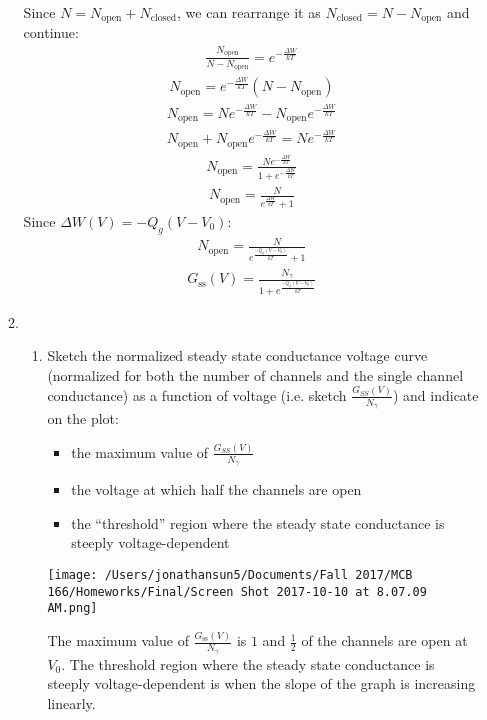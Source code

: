 \documentclass[11pt]{article}
\begin{document}
\begin{enumerate}[label=\arabic*.]
\begin{enumerate}[label=(\alph*)]
Since $N = N_{\text{open}} + N_{\text{closed}}$, we can rearrange it as $N_{\text{closed}} = N - N_{\text{open}}$ and continue:
\begin{align*}
\frac{N_{\text{open}}} {N - N_{\text{open}}} = e ^ {- \frac{\Delta W} {k T}}
\end{align*}
\begin{align*}
N_{\text{open}} = e ^ {- \frac{\Delta W} {k T}} \left(N - N_{\text{open}}\right)
\end{align*}
\begin{align*}
N_{\text{open}} = Ne ^ {- \frac{\Delta W} {k T}} - N_{\text{open}} e ^ {- \frac{\Delta W} {k T}}
\end{align*}
\begin{align*}
N_{\text{open}} + N_{\text{open}} e ^ {- \frac{\Delta W} {k T}} = Ne ^ {- \frac{\Delta W} {k T}}
\end{align*}
\begin{align*}
N_{\text{open}} = \frac{Ne ^ {- \frac{\Delta W} {k T}}} {1 + e ^ {- \frac{\Delta W} {k T}}}
\end{align*}
\begin{align*}
N_{\text{open}} = \frac{N} {e ^ {\frac{\Delta W} {k T}} + 1}
\end{align*}
Since $\Delta W(V) = -Q_g(V - V_0)$:
\begin{align*}
N_{\text{open}} = \frac{N} {e ^ {\frac{-Q_g(V - V_0)} {k T}} + 1}
\end{align*}
\begin{align*}
G_{\text{ss}}(V) = \frac{N_{\gamma}} {1 + e ^ {\frac{-Q_g(V - V_0)} {k T}}}
\end{align*}



\item
\begin{enumerate}[label=(\roman*)]
\item
Sketch the normalized steady state conductance voltage curve (normalized for both the number of channels and the single channel conductance) as a function of voltage (i.e. sketch $\frac{G_{SS}(V)} {N_{\gamma}}$) and indicate on the plot:
\begin{itemize}
\item
the maximum value of $\frac{G_{SS}(V)} {N_{\gamma}}$
\item
the voltage at which half the channels are open
\item
the ``threshold'' region where the steady state conductance is steeply voltage-dependent
\end{itemize}
\begin{center}
\texttt{[image: /Users/jonathansun5/Documents/Fall 2017/MCB 166/Homeworks/Final/Screen Shot 2017-10-10 at 8.07.09 AM.png]}
\end{center}
The maximum value of $\frac{G_{\text{ss}}(V)} {N_{\gamma}}$ is $1$ and $\frac{1} {2}$ of the channels are open at $V_0$. The threshold region where the steady state conductance is steeply voltage-dependent is when the slope of the graph is increasing linearly.




\end{enumerate}
\end{enumerate}
\end{enumerate}
\end{document}
